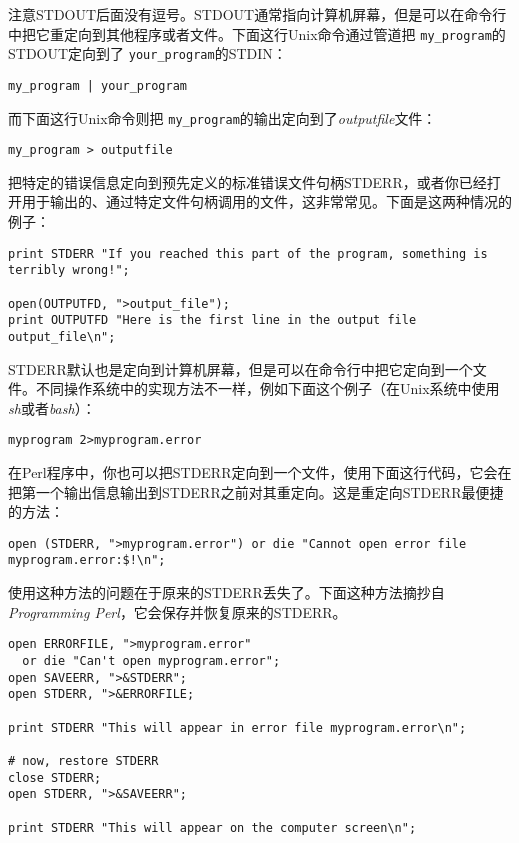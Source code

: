 注意STDOUT后面没有逗号。STDOUT通常指向计算机屏幕，但是可以在命令行中把它重定向到其他程序或者文件。下面这行Unix命令通过管道把 \verb|my_program|的STDOUT定向到了 \verb|your_program|的STDIN：

\begin{lstlisting}
my_program | your_program 
\end{lstlisting} 

而下面这行Unix命令则把 \verb|my_program|的输出定向到了\textit{outputfile}文件：

\begin{lstlisting}
my_program > outputfile
\end{lstlisting}

把特定的错误信息定向到预先定义的标准错误文件句柄STDERR，或者你已经打开用于输出的、通过特定文件句柄调用的文件，这非常常见。下面是这两种情况的例子：

\begin{lstlisting}
print STDERR "If you reached this part of the program, something is terribly wrong!";

open(OUTPUTFD, ">output_file");
print OUTPUTFD "Here is the first line in the output file output_file\n";
\end{lstlisting}

STDERR默认也是定向到计算机屏幕，但是可以在命令行中把它定向到一个文件。不同操作系统中的实现方法不一样，例如下面这个例子（在Unix系统中使用\textit{sh}或者\textit{bash}）：

\begin{lstlisting}
myprogram 2>myprogram.error
\end{lstlisting}

在Perl程序中，你也可以把STDERR定向到一个文件，使用下面这行代码，它会在把第一个输出信息输出到STDERR之前对其重定向。这是重定向STDERR最便捷的方法：

\begin{lstlisting}
open (STDERR, ">myprogram.error") or die "Cannot open error file myprogram.error:$!\n";
\end{lstlisting}

使用这种方法的问题在于原来的STDERR丢失了。下面这种方法摘抄自\textit{Programming Perl}，它会保存并恢复原来的STDERR。

\begin{lstlisting}
open ERRORFILE, ">myprogram.error" 
  or die "Can't open myprogram.error";
open SAVEERR, ">&STDERR";
open STDERR, ">&ERRORFILE;

print STDERR "This will appear in error file myprogram.error\n";

# now, restore STDERR 
close STDERR;
open STDERR, ">&SAVEERR";

print STDERR "This will appear on the computer screen\n";
\end{lstlisting}

